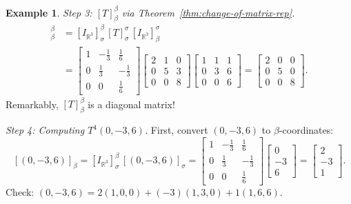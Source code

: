 \documentclass[11pt, a4paper, notitlepage]{report}
\theoremstyle{definition}
\newtheorem{example}[theorem]{Example}
\theoremstyle{remark}
\begin{document}
\begin{example}
\emph{Step 3: $[T]_\beta^\beta$ via Theorem~\ref{thm:change-of-matrix-rep}.}
\begin{align*}
  [T]_\beta^\beta
  &= [I_{\mathbb{R}^3}]_\sigma^\beta\,[T]_\sigma^\sigma\,[I_{\mathbb{R}^3}]_\beta^\sigma \\
  &= \begin{bmatrix} 1 & -\tfrac{1}{3} & \tfrac{1}{6} \\ 0 & \tfrac{1}{3} & -\tfrac{1}{3} \\ 0 & 0 & \tfrac{1}{6} \end{bmatrix}
     \begin{bmatrix} 2 & 1 & 0 \\ 0 & 5 & 3 \\ 0 & 0 & 8 \end{bmatrix}
     \begin{bmatrix} 1 & 1 & 1 \\ 0 & 3 & 6 \\ 0 & 0 & 6 \end{bmatrix}
  = \begin{bmatrix} 2 & 0 & 0 \\ 0 & 5 & 0 \\ 0 & 0 & 8 \end{bmatrix}.
\end{align*}
Remarkably, $[T]_\beta^\beta$ is a diagonal matrix!

\emph{Step 4: Computing $T^4(0,-3,6)$.}  First, convert $(0,-3,6)$ to $\beta$-coordinates:
\[
  [(0,-3,6)]_\beta
  = [I_{\mathbb{R}^3}]_\sigma^\beta\,[(0,-3,6)]_\sigma
  = \begin{bmatrix}1&-\tfrac{1}{3}&\tfrac{1}{6}\\0&\tfrac{1}{3}&-\tfrac{1}{3}\\0&0&\tfrac{1}{6}\end{bmatrix}
    \begin{bmatrix}0\\-3\\6\end{bmatrix}
  = \begin{bmatrix}2\\-3\\1\end{bmatrix}.
\]
Check: $(0,-3,6) = 2(1,0,0) + (-3)(1,3,0) + 1(1,6,6)$. \checkmark


\end{example}
\end{document}
